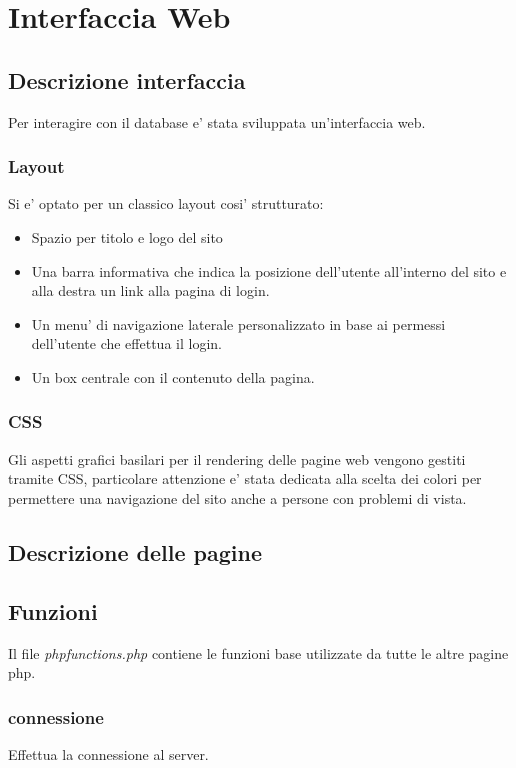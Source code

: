 \chapter{Interfaccia Web} 
 
\section{Descrizione interfaccia}

Per interagire con il database e' stata sviluppata un'interfaccia web.

\subsection{Layout}
Si e' optato per un classico layout cosi' strutturato:

\begin{itemize}
\item Spazio per titolo e logo del sito
\item Una barra informativa che indica la posizione dell'utente all'interno del sito e alla destra un link alla pagina di login.
\item Un menu' di navigazione laterale personalizzato in base ai permessi dell'utente che effettua il login.
\item Un box centrale con il contenuto della pagina.
\end{itemize}

\subsection{CSS}

Gli aspetti grafici basilari per il rendering delle pagine web vengono gestiti tramite CSS, particolare attenzione e' stata dedicata alla scelta dei colori per permettere una navigazione del sito anche a persone con problemi di vista.

\section{Descrizione delle pagine}

\section{Funzioni}
Il file \textit{phpfunctions.php} contiene le funzioni base utilizzate da tutte le altre pagine php.

\subsection{connessione}
Effettua la connessione al server.

